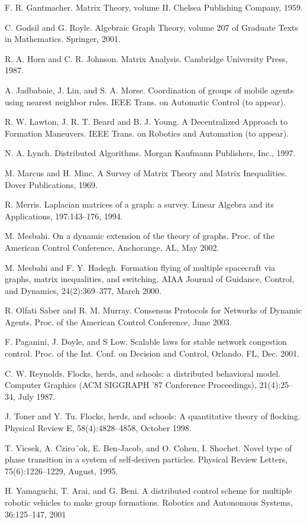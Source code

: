 \documentclass{article}
\begin{document}
\noindent [10] F. R. Gantmacher. Matrix Theory, volume II. Chelsea Publishing Company, 1959. 

\noindent [11] C. Godsil and G. Royle. Algebraic Graph Theory, volume 207 of Graduate Texts in Mathematics. Springer, 2001. 

\noindent [12] R. A. Horn and C. R. Johnson. Matrix Analysis. Cambridge University Press, 1987. 

\noindent [13] A. Jadbabaie, J. Lin, and S. A. Morse. Coordination of groups of mobile agents using nearest neighbor rules. IEEE Trans. on Automatic Control (to appear). 

\noindent [14] R. W. Lawton, J. R. T. Beard and B. J. Young. A Decentralized Approach to Formation Maneuvers. IEEE Trans. on Robotics and Automation (to appear). 

\noindent [15] N. A. Lynch. Distributed Algorithms. Morgan Kaufmann Publishers, Inc., 1997. 

\noindent [16] M. Marcus and H. Minc. A Survey of Matrix Theory and Matrix Inequalities. Dover Publications, 1969. 

\noindent [17] R. Merris. Laplacian matrices of a graph: a survey. Linear Algebra and its Applications, 197:143–176, 1994. 

\noindent [18] M. Mesbahi. On a dynamic extension of the theory of graphs. Proc. of the American Control Conference, Anchorange, AL, May 2002. 

\noindent [19] M. Mesbahi and F. Y. Hadegh. Formation ﬂying of multiple spacecraft via graphs, matrix inequalities, and switching. AIAA Journal of Guidance, Control, and Dynamics, 24(2):369–377, March 2000. 

\noindent [20] R. Olfati Saber and R. M. Murray. Consensus Protocols for Networks of Dynamic Agents. Proc. of the American Control Conference, June 2003. 

\noindent [21] F. Paganini, J. Doyle, and S Low. Scalable laws for stable network congestion control. Proc. of the Int. Conf. on Decision and Control, Orlando, FL, Dec. 2001. 

\noindent [22] C. W. Reynolds. Flocks, herds, and schools: a distributed behavioral model. Computer Graphics (ACM SIGGRAPH ’87 Conference Proceedings), 21(4):25–34, July 1987. 

\noindent [23] J. Toner and Y. Tu. Flocks, herds, and schools: A quantitative theory of ﬂocking. Physical Review E, 58(4):4828–4858, October 1998. 

\noindent [24] T. Vicsek, A. Cziro´ok, E. Ben-Jacob, and O. Cohen, I. Shochet. Novel type of phase transition in a system of self-deriven particles. Physical Review Letters, 75(6):1226–1229, August, 1995.

\noindent [25] H. Yamaguchi, T. Arai, and G. Beni. A distributed control scheme for multiple robotic vehicles to make group formations. Robotics and Autonomous Systems, 36:125–147, 2001
\end{document}
